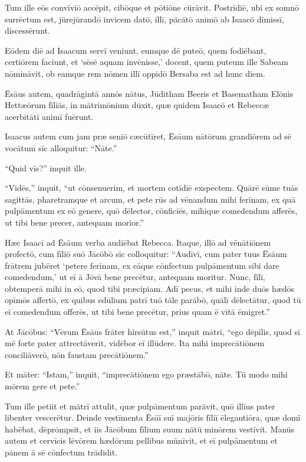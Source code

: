 \Versus Tum ille eōs convīviō accēpit, cibōque et pōtiōne cūrāvit.
\Versus Postrīdiē, ubi ex somnō surrēctum est, jūrejūrandō invicem datō, illī, pācātō animō ab Isaacō dīmissī, discessērunt.

\Versus Eōdem diē ad Isaacum servī veniunt, eumque dē puteō, quem fodiēbant, certiōrem faciunt, et `sēsē aquam invēnisse,' docent,
\Versus quem puteum ille Sabeam nōmināvit, ob eamque rem nōmen illī oppidō Bersaba est ad hunc diem.

\Versus Ēsāus autem, quadrāgintā annōs nātus, Jūditham Beeris et Basematham Elōnis Hettæōrum fīliās, in mātrimōnium dūxit,
\Versus quæ quidem Isaacō et Rebeccæ acerbitātī animī fuērunt.



\Caput
\Versus Isaacus autem cum jam præ seniō cæcūtīret, Ēsāum nātōrum grandiōrem ad sē vocātum sīc alloquitur: ``Nāte.''

``Quid vīs?'' inquit ille.

\Versus ``Vidēs,'' inquit, ``ut cōnsenuerim, et mortem cotīdiē exspectem.
\Versus Quārē sūme tuās sagittās, pharetramque et arcum, et pete rūs ad vēnandum mihi ferīnam,
\Versus ex quā pulpāmentum ex eō genere, quō dēlector, cōnficiēs, mihique comedendum afferēs, ut tibi bene precer, antequam morior.''

\Versus Hæc Isaacī ad Ēsāum verba audiēbat Rebecca. Itaque, illō ad vēnātiōnem profectō,
\Versus cum fīliō suō Jācōbō sīc colloquitur: ``Audīvī, cum pater tuus Ēsāum frātrem jubēret `petere ferīnam,
\Versus ex eāque cōnfectum pulpāmentum sibi dare comedendum,' ut eī ā Jōvā bene precētur, antequam moritur.
\Versus Nunc, fīlī, obtemperā mihi in eō, quod tibi præcipiam.
\Versus Adī pecus, et mihi inde duōs hædōs opīmōs affertō, ex quibus edūlium patrī tuō tāle parābō, quālī dēlectātur,
\Versus quod tū eī comedendum offerēs, ut tibi bene precētur, prius quam ē vītā ēmigret.''

\Versus At Jācōbus: ``Vērum Ēsāus frāter hirsūtus est,'' inquit mātrī, ``ego dēpilis,
\Versus quod sī mē forte pater attrectāverit, vidēbor eī illūdere. Ita mihi imprecātiōnem conciliāverō, nōn faustam precātiōnem.''

\Versus Et māter: ``Istam,'' inquit, ``imprecātiōnem ego præstābō, nāte. Tū modo mihi mōrem gere et pete.''

\Versus Tum ille petiit et mātrī attulit, quæ pulpāmentum parāvit, quō illīus pater libenter vescerētur.
\Versus Deinde vestīmenta Ēsāī suī majōris fīliī ēlegantiōra, quæ domī habēbat, dēprōmpsit, et iīs Jācōbum fīlium suum nātū minōrem vestīvit.
\Versus Manūs autem et cervīcis lēvōrem hædōrum pellibus mūnīvit,
\Versus et eī pulpāmentum et pānem ā sē cōnfectum trādidit.

